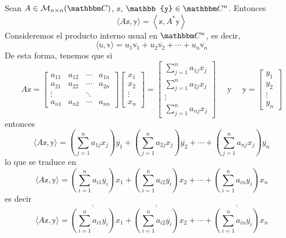 \begin{theorem}\label{inner_prod_A_Ahermitiana}
    Sean $A \in \mathcal{M}_{n \times n}(\CC)$, $\mathbb{x}$, $\mathbb{y} \in \CC[n]$. Entonces
    $$\langle A\mathbb{x}, \mathbb{y} \rangle = \left\langle \mathbb{x}, A^*\mathbb{y} \right\rangle$$
    \demostracion Consideremos el producto interno usual en $\CC[n]$, es decir,
    $$\langle \mathbb{u}, \mathbb{v} \rangle = u_1 \overline{\mathbb{v}_1} + u_2 \overline{\mathbb{v}_2} + \cdots + u_n \overline{\mathbb{v}_n}$$
    De esta forma, tenemos que si
    $$A\mathbb{x} = \begin{bmatrix}
        a_{11} & a_{12} & \cdots & a_{1n} \\
        a_{21} & a_{22} & \cdots & a_{2n} \\
        \vdots &  & \ddots & \\
        a_{n1} & a_{n2} & \cdots & a_{nn}
    \end{bmatrix} \begin{bmatrix}
        x_1 \\
        x_2 \\
        \vdots \\
        x_n
    \end{bmatrix} = \begin{bmatrix}
        \displaystyle\sum_{j=1}^n a_{1j}x_j \\
        \displaystyle\sum_{j=1}^n a_{2j}x_j \\
        \vdots \\
        \displaystyle\sum_{j=1}^n a_{nj}x_j
    \end{bmatrix} \quad \text{ y } \quad \mathbb{y} = \begin{bmatrix}
        y_1 \\
        y_2 \\
        \vdots \\
        y_n
    \end{bmatrix}$$\newpage\noindent
    entonces
    $$\langle A\mathbb{x}, \mathbb{y} \rangle = \left( \sum_{j=1}^n a_{1j}x_j \right) \overline{y_1} + \left( \sum_{j=1}^n a_{2j}x_j \right) \overline{y_2} + \cdots + \left( \sum_{j=1}^n a_{nj}x_j \right) \overline{y_n}$$
    lo que se traduce en
    $$\langle A\mathbb{x}, \mathbb{y} \rangle = \left( \sum_{i=1}^n a_{i1} \overline{y_i} \right) x_1 + \left( \sum_{i=1}^n a_{i2} \overline{y_i} \right) x_2 + \cdots + \left( \sum_{i=1}^n a_{in} \overline{y_i} \right) x_n$$
    es decir
    $$\langle A\mathbb{x}, \mathbb{y} \rangle = \overline{\overline{\left( \sum_{i=1}^n a_{i1} \overline{y_i} \right)}} x_1 + \overline{\overline{\left( \sum_{i=1}^n a_{i2} \overline{y_i} \right)}} x_2 + \cdots + \overline{\overline{\left( \sum_{i=1}^n a_{in} \overline{y_i} \right)}} x_n$$

\end{theorem}
